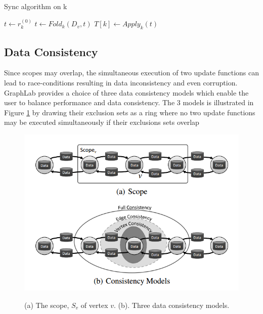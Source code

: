 \documentclass {report}
\begin{document}
\begin{algorithm}
\caption{Sync algorithm on k}
\label{sync_algo}
\begin{algorithmic}[1]
    \State $t \leftarrow r_k^{(0)}$
        \State $t \leftarrow Fold_k(D_v, t)$
    \EndFor
    \State $T[k] \leftarrow Apply_k(t)$

\EndProcedure


\end{algorithmic}
\end{algorithm}

\subsection{Data Consistency}
Since scopes may overlap, the simultaneous execution of
two update functions can lead to race-conditions resulting
in data inconsistency and even corruption. GraphLab provides
 a choice of three data consistency models which enable the user
  to balance performance and data consistency. The 3 models is illustrated in Figure \ref{graphlab_scope}
   by drawing their exclusion sets as a ring where no two update functions
    may be executed simultaneously if their exclusions sets overlap
\begin{figure}
  \centering
  \includegraphics[width=\textwidth]{graphlab_scope}\\
  \caption{(a) The scope, $S_v$ of vertex $v$. (b). Three data consistency
   models.}\label{graphlab_scope}
\end{figure}
\end{document}
